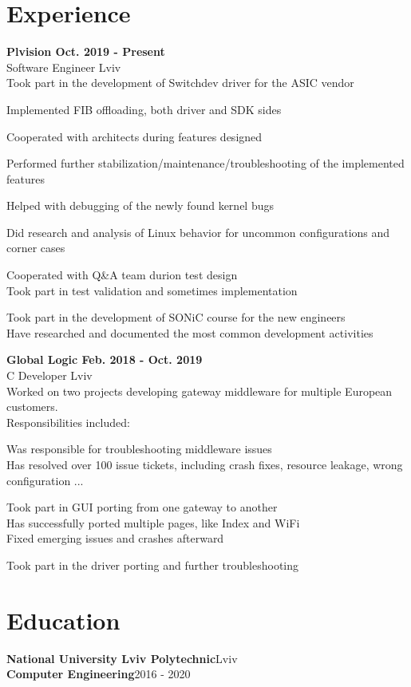 \documentclass{article}
\begin{document}
\section{Experience}
{\bfseries
Plvision \hspace*{\fill}Oct. 2019 - Present\\
}
\vspace{0.5em}
Software Engineer  \hspace*{\fill}Lviv\\
Took part in the development of Switchdev driver for the ASIC vendor
\begin{description}[align=left,leftmargin=3mm,style=multiline]
\item[-] Implemented FIB offloading, both driver and SDK sides
\item[-] Cooperated with architects during features designed
\item[-] Performed further stabilization/maintenance/troubleshooting of the implemented features
\item[-] Helped with debugging of the newly found kernel bugs
\item[-] Did research and analysis of Linux behavior for uncommon configurations and corner cases
\item[-] Cooperated with Q\&A team durion test design\\
         Took part in test validation and sometimes implementation
\item[-] Took part in the development of SONiC course for the new engineers \\
         Have researched and documented the most common development activities

\end{description}

\clearpage

{\bfseries
Global Logic \hspace*{\fill}Feb. 2018 - Oct. 2019\\
}
\vspace{0.5em}
C Developer  \hspace*{\fill}Lviv\\
Worked on two projects developing gateway middleware for multiple European customers.\\
Responsibilities included:
\begin{description}[align=left,leftmargin=3mm,style=multiline]
\item[-] Was responsible for troubleshooting middleware issues \\
         Has resolved over 100 issue tickets, including crash fixes, resource leakage,
         wrong configuration ...
\item[-] Took part in GUI porting from one gateway to another \\
         Has successfully ported multiple pages, like Index and WiFi \\
         Fixed emerging issues and crashes afterward 
\item[-] Took part in the driver porting and further troubleshooting
\end{description}

\section{Education}
\textbf{National University Lviv Polytechnic}\hspace*{\fill}Lviv\\
\textbf{Computer Engineering}\hspace*{\fill}2016 - 2020
\end{document}
